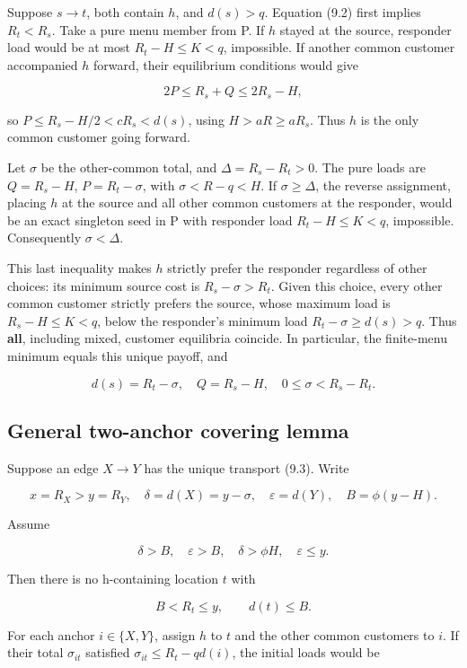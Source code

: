 \documentclass[11pt,a4paper]{article}
\begin{document}
Suppose \(s\to t\), both contain \(h\), and \(d(s)>q\). Equation (9.2) first implies \(R_t<R_s\). Take a pure menu member from P. If \(h\) stayed at the source, responder load would be at most \(R_t-H\le K<q\), impossible. If another common customer accompanied \(h\) forward, their equilibrium conditions would give

\[
2P\le R_s+Q\le2R_s-H,
\]

so \(P\le R_s-H/2<cR_s<d(s)\), using \(H>aR\ge aR_s\). Thus \(h\) is the only common customer going forward.

Let \(\sigma\) be the other-common total, and \(\Delta=R_s-R_t>0\). The pure loads are \(Q=R_s-H\), \(P=R_t-\sigma\), with \(\sigma<R-q<H\). If \(\sigma\ge\Delta\), the reverse assignment, placing \(h\) at the source and all other common customers at the responder, would be an exact singleton seed in P with responder load \(R_t-H\le K<q\), impossible. Consequently \(\sigma<\Delta\).

This last inequality makes \(h\) strictly prefer the responder regardless of other choices: its minimum source cost is \(R_s-\sigma>R_t\). Given this choice, every other common customer strictly prefers the source, whose maximum load is \(R_s-H\le K<q\), below the responder's minimum load \(R_t-\sigma\ge d(s)>q\). Thus \textbf{all}, including mixed, customer equilibria coincide. In particular, the finite-menu minimum equals this unique payoff, and

\[
d(s)=R_t-\sigma,\quad Q=R_s-H,\quad 0\le\sigma<R_s-R_t. \tag{9.3}
\]

\hypertarget{general-two-anchor-covering-lemma}{%
\subsection{General two-anchor covering lemma}\label{general-two-anchor-covering-lemma}}

Suppose an edge \(X\to Y\) has the unique transport (9.3). Write

\[
x=R_X>y=R_Y,\quad \delta=d(X)=y-\sigma,\quad \varepsilon=d(Y),
\quad B=\phi(y-H).
\]

Assume

\[
\delta>B,\quad \varepsilon>B,\quad \delta>\phi H,\quad \varepsilon\le y. \tag{9.4}
\]

Then there is no h-containing location \(t\) with

\[
B<R_t\le y,\qquad d(t)\le B. \tag{9.5}
\]

For each anchor \(i\in\{X,Y\}\), assign \(h\) to \(t\) and the other common customers to \(i\). If their total \(\sigma_{it}\) satisfied \(\sigma_{it}\le R_t-qd(i)\), the initial loads would be
\end{document}

